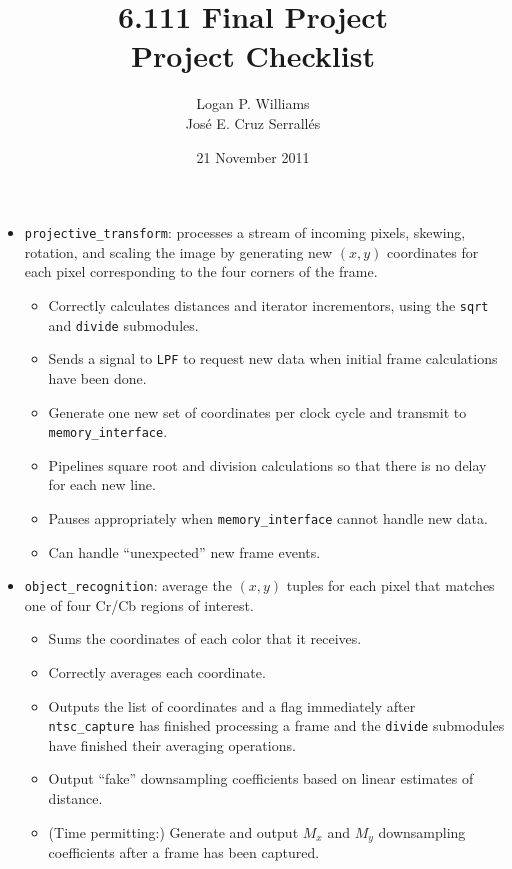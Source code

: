 \documentclass{article}
\title{6.111 Final Project\\Project Checklist}
\date{21 November 2011}
\author{Logan P. Williams\\Jos\'{e} E. Cruz Serrall\'{e}s}
\begin{document}
\maketitle

\begin{itemize}
\item[] {\tt projective\_transform}: processes a stream of incoming pixels, skewing, rotation, and scaling the image by generating new $(x,y)$ coordinates for each pixel corresponding to the four corners of the frame.
	\begin{itemize}
	\item Correctly calculates distances and iterator incrementors, using the {\tt sqrt} and {\tt divide} submodules. 
	\item Sends a signal to {\tt LPF} to request new data when initial frame calculations have been done.
	\item Generate one new set of coordinates per clock cycle and transmit to {\tt memory\_interface}.
	\item Pipelines square root and division calculations so that there is no delay for each new line.
	\item Pauses appropriately when {\tt memory\_interface} cannot handle new data.
	\item Can handle ``unexpected'' new frame events.
	\end{itemize}

\item[] {\tt object\_recognition}: average the $(x,y)$ tuples for each pixel that matches one of four Cr/Cb regions of interest.
	\begin{itemize}
	\item Sums the coordinates of each color that it receives.
	\item Correctly averages each coordinate.
	\item Outputs the list of coordinates and a flag immediately after {\tt ntsc\_capture} has finished processing a frame and the {\tt divide} submodules have finished their averaging operations.
	\item Output ``fake'' downsampling coefficients based on linear estimates of distance.
	\item (Time permitting:) Generate and output $M_x$ and $M_y$ downsampling coefficients after a frame has been captured.
	\end{itemize}


\end{itemize}
\end{document}
